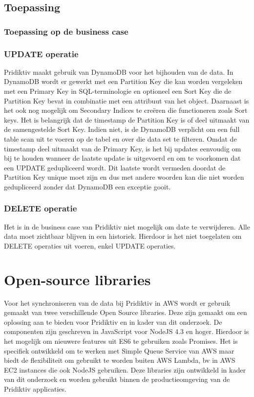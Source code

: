 \subsection{Toepassing}
\subsubsection{Toepassing op de business case}
\subsubsection{UPDATE operatie}
Pridiktiv maakt gebruik van DynamoDB voor het bijhouden van de data. In DynamoDB wordt er gewerkt met een Partition Key die kan worden vergeleken met een Primary Key in SQL-terminologie en optioneel een Sort Key die  de Partition Key bevat in combinatie met een attribuut van het object. Daarnaast is het ook nog mogelijk om Secondary Indices te cre\"eren die functioneren zoals Sort keys.  Het is belangrijk dat de timestamp de Partition Key is of deel uitmaakt van de samengestelde Sort Key. Indien niet, is de DynamoDB verplicht om een full table scan uit te voeren op de tabel en over die data set te filteren. Omdat de timestamp deel uitmaakt van de Primary Key, is het bij updates eenvoudig om bij te houden wanneer de laatste update is uitgevoerd en om te voorkomen dat een UPDATE gedupliceerd wordt. Dit laatste wordt vermeden doordat de Partition Key unique moet zijn en dus met andere woorden kan die niet worden gedupliceerd zonder dat DynamoDB een exceptie gooit.
\subsubsection{DELETE operatie}
Het is in de business case van Pridiktiv niet mogelijk om date te verwijderen. Alle data moet zichtbaar blijven in een historiek. Hierdoor is het niet toegelaten om DELETE operaties uit voeren, enkel UPDATE operaties. 
\section{Open-source libraries}
Voor het synchroniseren van de data bij Pridiktiv in AWS wordt er gebruik gemaakt van twee verschillende Open Source libraries. Deze zijn gemaakt om een oplossing aan te bieden voor Pridiktiv en in kader van dit onderzoek. De componenten zijn geschreven in JavaScript voor NodeJS 4.3 en hoger. Hierdoor is het mogelijk om nieuwere features uit ES6 te gebruiken zoals Promises. Het is specifiek ontwikkeld om te werken met Simple Queue Service van AWS maar biedt de flexibiliteit om gebruikt te worden buiten AWS Lambda, bv in AWS EC2 instances die ook NodeJS gebruiken. Deze libraries zijn ontwikkeld in kader van dit onderzoek en worden gebruikt binnen de productieomgeving van de Pridiktiv applicaties.
